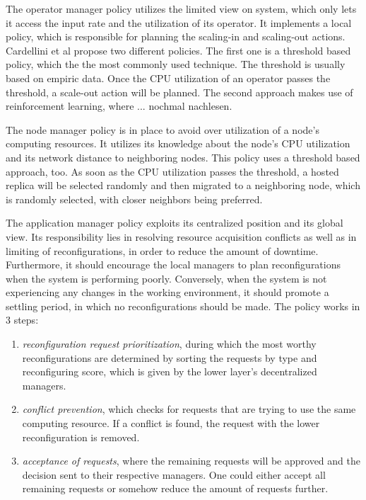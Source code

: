         \quad The operator manager policy utilizes the limited view on system, which only lets it access the input rate and the utilization of its operator.
        It implements a local policy, which is responsible for planning the scaling-in and scaling-out actions. Cardellini et al propose two different policies.
        The first one is a threshold based policy, which the the most commonly used technique. The threshold is usually based on empiric data. Once the CPU utilization 
        of an operator passes the threshold, a scale-out action will be planned. 
        The second approach makes use of reinforcement learning, where ... {nochmal nachlesen}.

        \quad The node manager policy is in place to avoid over utilization of a node's computing resources. 
        It utilizes its knowledge about the node's CPU utilization and its network distance to neighboring nodes.
        This policy uses a threshold based approach, too. As soon as the CPU utilization passes the threshold, a hosted replica will be selected 
        randomly and then migrated to a neighboring node, which is randomly selected, with closer neighbors being preferred. 

        \quad The application manager policy exploits its centralized position and its global view. 
        Its responsibility lies in resolving resource acquisition conflicts as well as in limiting of reconfigurations, 
        in order to reduce the amount of downtime. Furthermore, it should encourage the local managers to plan reconfigurations when the system 
        is performing poorly. Conversely, when the system is not experiencing any changes in the working environment, it should promote a settling period, 
        in which no reconfigurations should be made.
        The policy works in 3 steps:

        \begin{enumerate}
            \item \textit{reconfiguration request prioritization}, during which the most worthy reconfigurations are determined by sorting the requests 
            by type and reconfiguring score, which is given by the lower layer's decentralized managers. 
            \item \textit{conflict prevention}, which checks for requests that are trying to use the same computing resource. If a conflict is found, the 
            request with the lower reconfiguration is removed.
            \item \textit{acceptance of requests}, where the remaining requests will be approved and the decision sent to their respective managers. 
            One could either accept all remaining requests or somehow reduce the amount of requests further.
        \end{enumerate}


